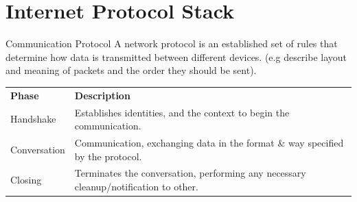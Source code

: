 \section{Internet Protocol Stack}
\begin{definitionbox}{Communication Protocol}
    A network protocol is an established set of rules that determine how data is transmitted between different devices. (e.g describe layout and meaning of packets and the order they should be sent).
    \begin{center}
        \begin{tabular}{l p{}}
            \textbf{Phase} & \textbf{Description}                                                                 \\
            Handshake      & Establishes identities, and the context to begin the communication.                  \\
            Conversation   & Communication, exchanging data in the format \& way specified by the protocol.       \\
            Closing        & Terminates the conversation, performing any necessary cleanup/notification to other. \\
        \end{tabular}
    \end{center}
\end{definitionbox}

